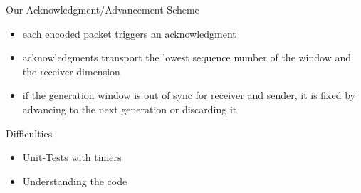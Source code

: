 \documentclass[11pt]{beamer}
\begin{document}
	\begin{frame}{Our Acknowledgment/Advancement Scheme}
		\begin{itemize}
			\item each encoded packet triggers an acknowledgment
			\item acknowledgments transport the lowest sequence number of the window and the receiver dimension
			\item if the generation window is out of sync for receiver and sender, it is fixed by advancing to the next generation or discarding it
		\end{itemize}
	\end{frame}

	\begin{frame}{Difficulties}
		\begin{itemize}
			\item Unit-Tests with timers
			\item Understanding the code
		\end{itemize}
	\end{frame}
\end{document}
